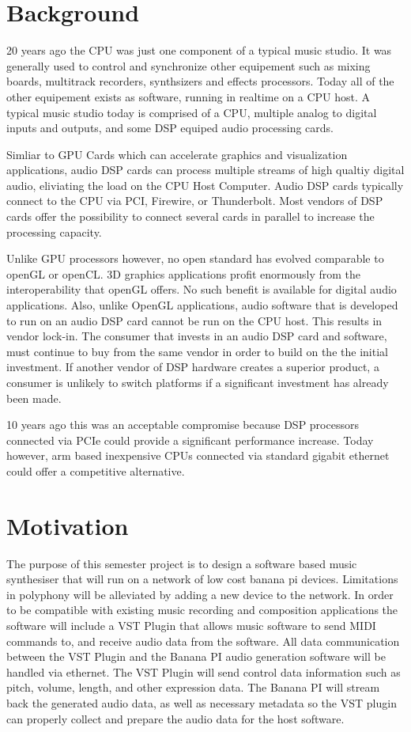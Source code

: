\section{Background}

20 years ago the CPU was just one component of a typical music studio. It was generally used to control and synchronize other equipement such as mixing boards, multitrack recorders, synthsizers and effects processors. Today all of the other equipement exists as software, running in realtime on a CPU host. A typical music studio today is comprised of a CPU, multiple analog to digital inputs and outputs, and some DSP equiped audio processing cards.

Simliar to GPU Cards which can accelerate graphics and visualization applications, audio DSP cards can process multiple streams of high qualtiy digital audio, eliviating the load on the CPU Host Computer. Audio DSP cards typically connect to the CPU via PCI, Firewire, or Thunderbolt. Most vendors of DSP cards offer the possibility to connect several cards in parallel to increase the processing capacity.

Unlike GPU processors however, no open standard has evolved comparable to openGL or openCL. 3D graphics applications profit enormously from the interoperability that openGL offers. No such benefit is available for digital audio applications. Also, unlike OpenGL applications, audio software that is developed to run on an audio DSP card cannot be run on the CPU host. This results in vendor lock-in. The consumer that invests in an audio DSP card and software, must continue to buy from the same vendor in order to build on the the initial investment. If another vendor of DSP hardware creates a superior product, a consumer is unlikely to switch platforms if a significant investment has already been made.

10 years ago this was an acceptable compromise because DSP processors connected via PCIe could provide a significant performance increase. Today however, arm based inexpensive CPUs connected via standard gigabit ethernet could offer a competitive alternative.

\section{Motivation}

The purpose of this semester project is to design a software based music synthesiser that will run on a network of low cost banana pi devices. Limitations in polyphony will be alleviated by adding a new device to the network. In order to be compatible with existing music recording and composition applications the software will include a VST Plugin that allows music software to send MIDI commands to, and receive audio data from the software. All data communication between the VST Plugin and the Banana PI audio generation software will be handled via ethernet. The VST Plugin will send control data information such as pitch, volume, length, and other expression data. The Banana PI will stream back the generated audio data, as well as necessary metadata so the VST plugin can properly collect and prepare the audio data for the host software.

